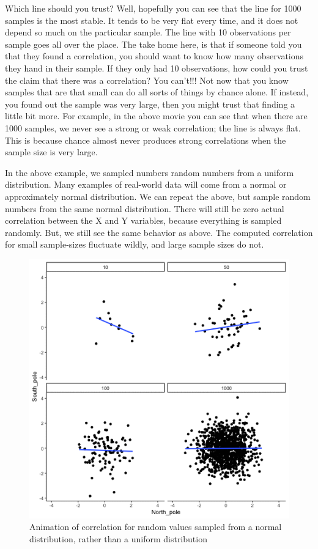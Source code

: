 \documentclass[]{book}
\begin{document}
Which line should you trust? Well, hopefully you can see that the line for 1000 samples is the most stable. It tends to be very flat every time, and it does not depend so much on the particular sample. The line with 10 observations per sample goes all over the place. The take home here, is that if someone told you that they found a correlation, you should want to know how many observations they hand in their sample. If they only had 10 observations, how could you trust the claim that there was a correlation? You can't!!! Not now that you know samples that are that small can do all sorts of things by chance alone. If instead, you found out the sample was very large, then you might trust that finding a little bit more. For example, in the above movie you can see that when there are 1000 samples, we never see a strong or weak correlation; the line is always flat. This is because chance almost never produces strong correlations when the sample size is very large.

In the above example, we sampled numbers random numbers from a uniform distribution. Many examples of real-world data will come from a normal or approximately normal distribution. We can repeat the above, but sample random numbers from the same normal distribution. There will still be zero actual correlation between the X and Y variables, because everything is sampled randomly. But, we still see the same behavior as above. The computed correlation for small sample-sizes fluctuate wildly, and large sample sizes do not.

\begin{figure}
\centering
\includegraphics{gifs/corNormFourNs-1.gif}
\caption{\label{fig:3normCorfour}Animation of correlation for random values sampled from a normal distribution, rather than a uniform distribution}
\end{figure}
\end{document}
